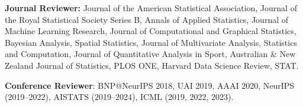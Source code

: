 \documentclass[10pt]{article}
\begin{document}
\textbf{Journal Reviewer:} Journal of the American Statistical Association, Journal of the Royal Statistical Society Series B, Annals of Applied Statistics, Journal of Machine Learning Research, Journal of Computational and Graphical Statistics, Bayesian Analysis, Spatial Statistics, Journal of Multivariate Analysis, Statistics and Computation, Journal of Quantitative Analysis in Sport, Australian \& New Zealand Journal of Statistics, PLOS ONE, Harvard Data Science Review, STAT. 

\textbf{Conference Reviewer}: BNP@NeurIPS 2018, UAI 2019, AAAI 2020,  NeurIPS (2019--2022), AISTATS (2019--2024), ICML (2019, 2022, 2023).
\end{document}
